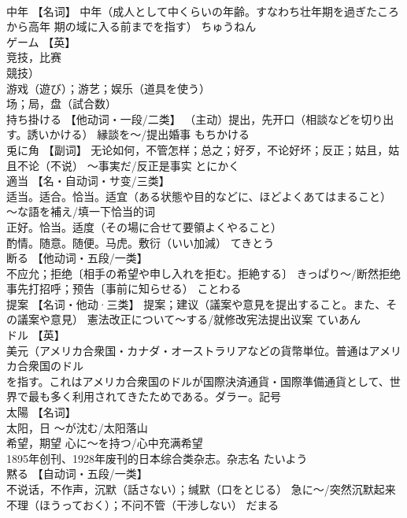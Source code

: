 \documentclass[8pt]{extreport}
\begin{document}
\begin{CJK}{UTF8}{min}
\\	中年	【名词】 中年（成人として中くらいの年齢。すなわち壮年期を過ぎたころから高年 期の域に入る前までを指す）	ちゅうねん	
\\	ゲーム	【英】
\\	竞技，比赛
\\	競技） 
\\	游戏（遊び）；游艺；娱乐（道具を使う） 
\\	场；局，盘（試合数）		
\\	持ち掛ける	【他动词・一段/二类】 （主动）提出，先开口（相談などを切り出す。誘いかける） 縁談を～/提出婚事	もちかける	
\\	兎に角	【副词】 无论如何，不管怎样；总之；好歹，不论好坏；反正；姑且，姑且不论（不说） ～事実だ/反正是事实	とにかく	
\\	適当	【名・自动词・サ变/三类】 
\\	适当。适合。恰当。适宜（ある状態や目的などに、ほどよくあてはまること） ～な語を補え/填一下恰当的词 
\\	正好。恰当。适度（その場に合せて要領よくやること） 
\\	酌情。随意。随便。马虎。敷衍（いい加減）	てきとう	
\\	断る	【他动词・五段/一类】 
\\	不应允；拒绝〔相手の希望や申し入れを拒む。拒絶する〕 きっぱり～/断然拒绝 
\\	事先打招呼；预告〔事前に知らせる）	ことわる	
\\	提案	【名词・他动·三类】 提案；建议（議案や意見を提出すること。また、その議案や意見） 憲法改正について～する/就修改宪法提出议案	ていあん	
\\	ドル	【英】
\\	美元（アメリカ合衆国・カナダ・オーストラリアなどの貨幣単位。普通はアメリカ合衆国のドル
\\	を指す。これはアメリカ合衆国のドルが国際決済通貨・国際準備通貨として、世界で最も多く利用されてきたためである。ダラー。記号
\\	太陽	【名词】 
\\	太阳，日 ～が沈む/太阳落山 
\\	希望，期望 心に～を持つ/心中充满希望 
\\	1895年创刊、1928年废刊的日本综合类杂志。杂志名	たいよう	
\\	黙る	【自动词・五段/一类】 
\\	不说话，不作声，沉默（話さない）；缄默（口をとじる） 急に～/突然沉默起来 
\\	不理（ほうっておく）；不问不管（干渉しない）	だまる	

\end{CJK}
\end{document}
